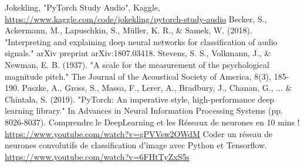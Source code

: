 \documentclass{article}
\begin{document}
\newpage
\begin{thebibliography}{9}
     Jokekling, "PyTorch Study Audio", Kaggle, \url{https://www.kaggle.com/code/jokekling/pytorch-study-audio}
     Becker, S., Ackermann, M., Lapuschkin, S., Müller, K. R., \& Samek, W. (2018). "Interpreting and explaining deep neural networks for classification of audio signals." arXiv preprint arXiv:1807.03418.
     Stevens, S. S., Volkmann, J., \& Newman, E. B. (1937). "A scale for the measurement of the psychological magnitude pitch." The Journal of the Acoustical Society of America, 8(3), 185-190.
     Paszke, A., Gross, S., Massa, F., Lerer, A., Bradbury, J., Chanan, G., ... \& Chintala, S. (2019). "PyTorch: An imperative style, high-performance deep learning library." In Advances in Neural Information Processing Systems (pp. 8026-8037).
     Comprendre le DeepLearning et les Réseaux de neurones en 10 mins ! \url{https://www.youtube.com/watch?v=gPVVsw2OWdM}
     Coder un réseau de neurones convolutifs de classification d'image avec Python et Tensorflow. \url{https://www.youtube.com/watch?v=6FHtTyZxS5s}
\end{thebibliography}
\end{document}
